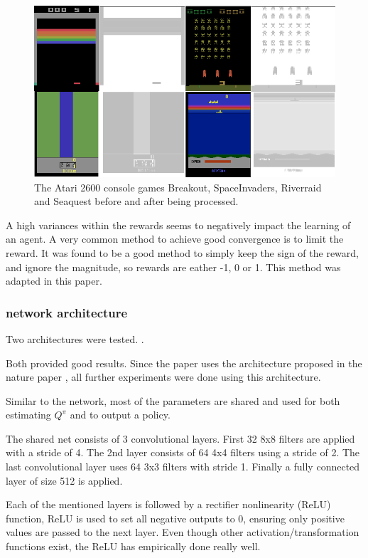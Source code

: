 \begin{figure}
\includegraphics[scale=0.5]{bilder/atarienv.png}
\caption{The Atari 2600 console games Breakout, SpaceInvaders, Riverraid and Seaquest before and after being processed.}
\end{figure}

A high variances within the rewards seems to negatively impact the learning of an agent.
A very common method to achieve good convergence is to limit the reward. 
It was found to be a good method to simply keep the sign of the reward, and ignore the magnitude, so rewards are eather -1, 0 or 1. This method was adapted in this paper.


\subsubsection{network architecture}

Two architectures were tested. \citep{mnih2015atari} \citep{nature}.

Both provided good results. Since the paper uses the architecture proposed in the nature paper \citep{nature}, all further experiments were done using this architecture.

Similar to the \citep{A3C} network, most of the parameters are shared and used for both estimating $Q^\pi$ and to output a policy.

The shared net consists of 3 convolutional layers.
First 32 8x8 filters are applied with a stride of 4.
The 2nd layer consists of 64 4x4 filters using a stride of 2.
The last convolutional layer uses 64 3x3 filters with stride 1.
Finally a fully connected layer of size 512 is applied.

Each of the mentioned layers is followed by a rectifier nonlinearity (ReLU) function, ReLU is used to set all negative outputs to 0, ensuring only positive values are passed to the next layer.
Even though other activation/transformation functions exist, the ReLU has empirically done really well. 

